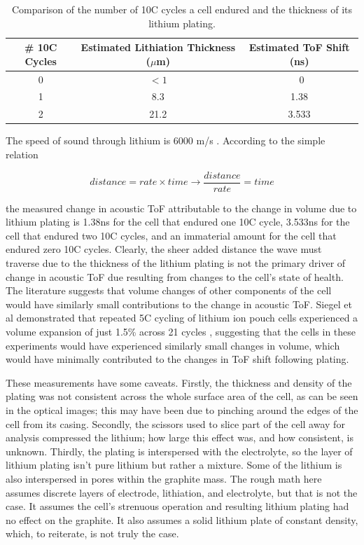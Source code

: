 \begin{table}[h]
    \centering
    \begin{tabular}{c|c|c}
         \# 10C Cycles & Estimated Lithiation Thickness ($\mu$m) & Estimated ToF Shift (ns) \\
         \hline
         0 & $<1$ & ~0 \\
         1 & 8.3 & 1.38 \\
         2 & 21.2 & 3.533 \\
    \end{tabular}
    \caption{Comparison of the number of 10C cycles a cell endured and the thickness of its lithium plating.}
    \label{tab:plating}
\end{table}

The speed of sound through lithium is 6000 m/s \cite{lithium}. According to the simple relation

$$ distance = rate \times time \rightarrow \frac{distance}{rate} = time$$

the measured change in acoustic ToF attributable to the change in volume due to lithium plating is 1.38ns for the cell that endured one 10C cycle, 3.533ns for the cell that endured two 10C cycles, and an immaterial amount for the cell that endured zero 10C cycles. Clearly, the sheer added distance the wave must traverse due to the thickness of the lithium plating is not the primary driver of change in acoustic ToF due resulting from changes to the cell's state of health. The literature suggests that volume changes of other components of the cell would have similarly small contributions to the change in acoustic ToF. Siegel et al demonstrated that repeated 5C cycling of lithium ion pouch cells experienced a volume expansion of just 1.5\% across 21 cycles \cite{EXPANSION}, suggesting that the cells in these experiments would have experienced similarly small changes in volume, which would have minimally contributed to the changes in ToF shift following plating.

These measurements have some caveats. 
Firstly, the thickness and density of the plating was not consistent across the whole surface area of the cell, as can be seen in the optical images; this may have been due to pinching around the edges of the cell from its casing.
Secondly, the scissors used to slice part of the cell away for analysis compressed the lithium; how large this effect was, and how consistent, is unknown. 
Thirdly, the plating is interspersed with the electrolyte, so the layer of lithium plating isn't pure lithium but rather a mixture.
Some of the lithium is also interspersed in pores within the graphite mass.
The rough math here assumes discrete layers of electrode, lithiation, and electrolyte, but that is not the case.
It assumes the cell's strenuous operation and resulting lithium plating had no effect on the graphite.
It also assumes a solid lithium plate of constant density, which, to reiterate, is not truly the case.

